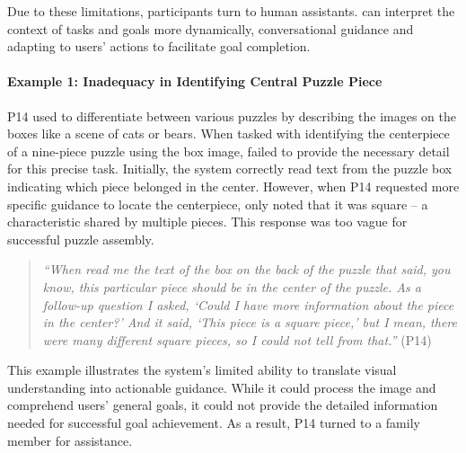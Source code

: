 Due to these limitations, participants turn to human assistants.  can interpret the context of tasks and goals more dynamically,  conversational guidance and adapting to users' actions to facilitate goal completion. 




\paragraph{Example 1: Inadequacy in Identifying Central Puzzle Piece}

P14 used \sbma{} to differentiate between various puzzles by describing the images on the boxes like a scene of cats or bears. 
% 
When tasked with identifying the centerpiece of a nine-piece puzzle using the box image, \sbma{} failed to provide the necessary detail for this precise task. 
% 
Initially, the system correctly read text from the puzzle box indicating which piece belonged in the center. 
However, when P14 requested more specific guidance to locate the centerpiece, \sbma{} only noted that it was square -- a characteristic shared by multiple pieces. This response was too vague for successful puzzle assembly. 



\begin{quote}
    \textit{``When \bma{} read me the text of the box on the back of the puzzle that said, you know, this particular piece should be in the center of the puzzle. As a follow-up question I asked, `Could I have more information about the piece in the center?' And it said, `This piece is a square piece,' but I mean, there were many different square pieces, so I could not tell from that.''} (P14)
\end{quote}
% 
This example illustrates the system's limited ability to translate visual understanding into actionable guidance. While it could process the image and comprehend users' general goals, it could not provide the detailed information needed for successful goal achievement. 
As a result, P14 turned to a family member for assistance. 


